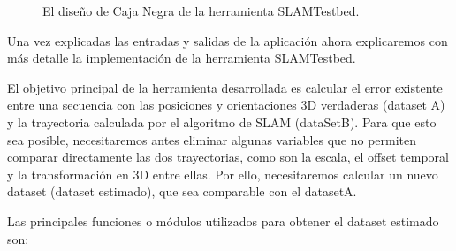 \begin{figure}[H]
\begin{center}
\hspace{0.5cm}
\end{center}
\caption{ El diseño de Caja Negra de la herramienta SLAMTestbed. }
\end{figure}

Una vez explicadas las entradas y salidas de la aplicación ahora explicaremos
con más detalle la implementación de la herramienta SLAMTestbed. 

El objetivo principal de la herramienta desarrollada es calcular el error existente entre una secuencia con las posiciones y orientaciones 3D verdaderas (dataset A) y la trayectoria calculada por el algoritmo de SLAM (dataSetB). Para que esto sea posible, necesitaremos antes eliminar algunas variables que no permiten comparar directamente las dos trayectorias, como son la escala, el offset temporal y la transformación en 3D entre ellas. Por ello, necesitaremos calcular un nuevo dataset (dataset estimado), que sea comparable con el datasetA. 

Las principales funciones o módulos utilizados para obtener el dataset estimado son:

